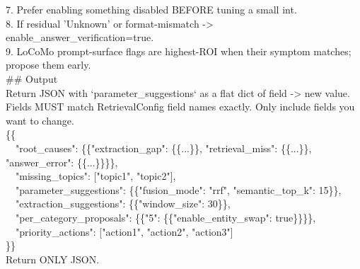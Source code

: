 \begin{tcolorbox}[title={\textbf{Diagnosis Engine: System + User Prompt}}, breakable, colback=yellow!5, colframe=yellow!50!brown]
7. Prefer enabling something disabled BEFORE tuning a small int.\\
8. If residual 'Unknown' or format-mismatch -> enable\_answer\_verification=true.\\
9. LoCoMo prompt-surface flags are highest-ROI when their symptom matches; propose them early.\\[0.3em]
\#\# Output\\
Return JSON with `parameter\_suggestions` as a flat dict of field -> new value. Fields MUST match RetrievalConfig field names exactly. Only include fields you want to change.\\[0.3em]
\{\{\\
\ \ "root\_causes": \{\{"extraction\_gap": \{\{...\}\}, "retrieval\_miss": \{\{...\}\}, "answer\_error": \{\{...\}\}\}\},\\
\ \ "missing\_topics": ["topic1", "topic2"],\\
\ \ "parameter\_suggestions": \{\{"fusion\_mode": "rrf", "semantic\_top\_k": 15\}\},\\
\ \ "extraction\_suggestions": \{\{"window\_size": 30\}\},\\
\ \ "per\_category\_proposals": \{\{"5": \{\{"enable\_entity\_swap": true\}\}\}\},\\
\ \ "priority\_actions": ["action1", "action2", "action3"]\\
\}\}\\[0.3em]
Return ONLY JSON.
\end{tcolorbox}


